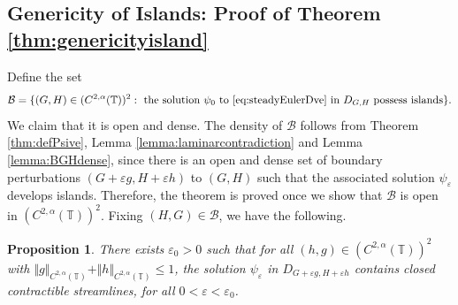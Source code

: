 \documentclass[11pt,reqno]{amsproc}
\newtheorem{proposition}{Proposition}[section]
\newcommand{\ve}{\varepsilon}
\numberwithin{equation}{section}
\numberwithin{theorem}{section}
\numberwithin{prop}{section}
\numberwithin{cor}{section}
\numberwithin{lemma}{section}
\theoremstyle{remark}
\theoremstyle{definition}
\begin{document}
\subsection{Genericity of Islands: Proof of Theorem \ref{thm:genericityisland}} Define the set
\begin{equation}
\mathcal{B} = \lbrace (G,H)\in (C^{2,\alpha}(\mathbb{T}))^2 : \text{ the solution }\psi_0 \text{ to } \eqref{eq:steadyEulerDve} \text{ in } D_{G,H} \text{ possess islands} \rbrace.
\end{equation}
We claim that it
is open and dense. The density of $\mathcal{B}$ follows from Theorem \ref{thm:defPsive}, Lemma \ref{lemma:laminarcontradiction} and Lemma \ref{lemma:BGHdense}, since there is an open and dense set of boundary perturbations $(G+\ve g,H + \ve h)$ to $(G,H)$ such that the associated solution $\psi_\ve$ develops islands. Therefore, the theorem is proved once we show that $\mathcal{B}$ is open in $(C^{2,\alpha}(\mathbb{T}))^2$. Fixing $(H,G)\in \mathcal{B}$, we have the following. 

\begin{proposition}\label{islandsopen}
There exists $\ve_0>0$ such that for all $(h,g)\in (C^{2,\alpha}(\mathbb{T}))^2$ with $\Vert g \Vert_{C^{2,\alpha}(\mathbb{T})}+\Vert h \Vert_{C^{2,\alpha}(\mathbb{T})}\leq 1$, the solution $\psi_\ve$ in $D_{G+\ve g, H+\ve h}$ contains closed contractible streamlines, for all $0<\ve < \ve_0$.
\end{proposition}
\end{document}
